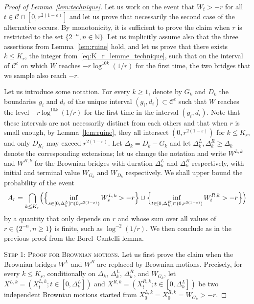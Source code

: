 \documentclass[british, a4paper,11pt]{article}
\numberwithin{equation}{section}
\theoremstyle{definition}
\newcommand{\N}{\mathbb{N}}
\begin{document}
\begin{proof}[Proof of Lemma~\ref{lem:technique}]
Let us work on the event that $W_t > -r$ for all $t \in \mathcal{C} \cap [0, r^{2(1-\varepsilon)}]$ and let us prove that necessarily the second case of the alternative occurs.
By monotonicity, it is sufficient to prove the claim when $r$ is restricted to the set $\{2^{-n}, n \in \N\}$. 
Let us implicitly assume also that the three assertions from Lemma~\ref{lem:ruine} hold, and let us prove that there exists $k \leq K_r$, the integer from~\eqref{eq:K_r_lemme_technique}, such that on the interval of $\mathcal{C}^c$ on which $W$ reaches $-r \log^{10k}(1/r)$ for the first time, the two bridges that we sample also reach $-r$.

 
Let us introduce some notation. For every $k \geq 1$, denote by $G_k$ and $D_k$ the boundaries $g_i$ and $d_i$ of the unique interval $(g_i, d_i) \subset \mathcal{C}^c$ such that 
$W$ reaches the level $-r \log^{10 k}(1/r)$ for the first time in the interval $(g_i, d_i)$. 
Note that these intervals are not necessarily distinct from each others and that when $r$ is small enough, by Lemma~\ref{lem:ruine}, they all intersect $(0, r^{2(1-\varepsilon)})$ for $k \leq K_{r}$, and only $D_{K_r}$ may exceed $r^{2(1-\varepsilon)}$. 
Let $\Delta_k = D_k-G_k$ and let $\Delta^L_k, \Delta^R_k \geq \Delta_k$ denote the corresponding extensions; let us change the notation and write $W^{L,k}$ and $W^{R,k}$ for the Brownian bridges with duration $\Delta^L_k$ and $\Delta^R_k$ respectively, with initial and terminal value $W_{G_k}$ and $W_{D_k}$ respectively.
We shall upper bound the probability of the event
\[A_r = \bigcap_{k \leq K_r} \Bigl(\Bigl\{\inf_{s \in [0,\Delta^L_k] \cap (0, r^{2(1-\varepsilon)})} W^{L,k}_s > -r\Bigr\} \cup \Bigl\{\inf_{t \in [0,\Delta^R_k] \cap (0, r^{2(1-\varepsilon)})} W^{R,k}_t > -r\Bigr\}\Bigr)\]
by a quantity that only depends on $r$ and whose sum over all values of $r \in \{2^{-n}, n \geq 1\}$ is finite, such as $\log^{-2}(1/r)$. 
We then conclude as in the previous proof from the Borel--Cantelli lemma. 
\medskip

\textsc{Step 1: Proof for Brownian motions.}
Let us first prove the claim when the Brownian bridges $W^L$ and $W^R$ are replaced by Brownian motions. Precisely, for every $k \leq K_r$, conditionally on $\Delta_k$, $\Delta_k^L$, $\Delta_k^R$, and $W_{G_k}$, let $X^{L,k} = (X^{L,k}_t ; t \in [0, \Delta_k^L])$ and $X^{R,k} = (X^{R,k}_t ; t \in [0, \Delta_k^L])$ be two independent Brownian motions started from $X^{L,k}_0=X^{R,k}_0=W_{G_k} > -r$.


\end{proof}
\end{document}
